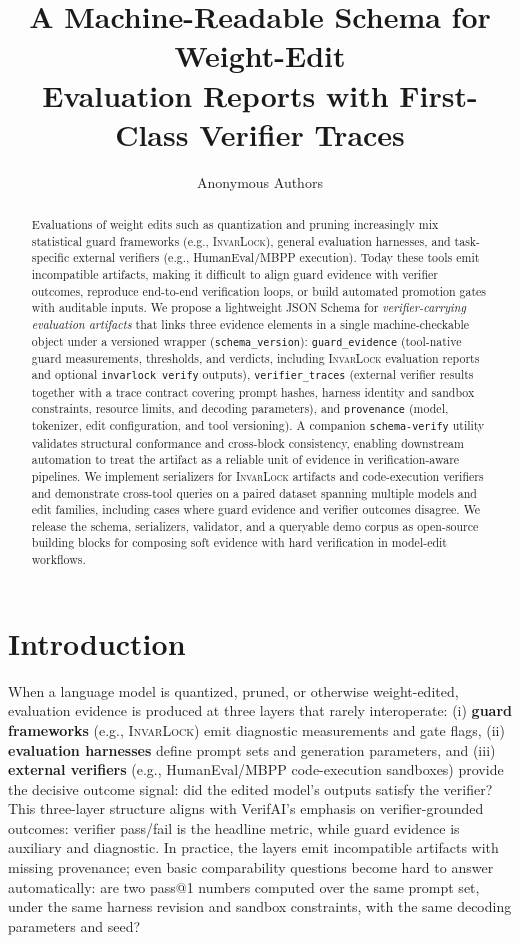 \documentclass{article} %
\title{A Machine-Readable Schema for Weight-Edit\\Evaluation Reports with First-Class Verifier Traces}
\author{Anonymous Authors}
\newcommand{\invarlock}{\textsc{InvarLock}\xspace}
\newcommand{\schemaverify}{\texttt{schema-verify}\xspace}
\begin{document}
\maketitle

\begin{abstract}
Evaluations of weight edits such as quantization and pruning increasingly mix
statistical guard frameworks (e.g., \invarlock), general evaluation harnesses,
and task-specific external verifiers (e.g., HumanEval/MBPP execution).
Today these tools emit incompatible artifacts, making it difficult to align guard
evidence with verifier outcomes, reproduce end-to-end verification loops, or
build automated promotion gates with auditable inputs.
We propose a lightweight JSON Schema for \emph{verifier-carrying evaluation artifacts}
that links three evidence elements in a single machine-checkable object under a
versioned wrapper (\texttt{schema\_version}):
\texttt{guard\_evidence} (tool-native guard measurements, thresholds, and verdicts, including
\invarlock evaluation reports and optional \texttt{invarlock verify} outputs),
\texttt{verifier\_traces} (external verifier results together with a trace contract covering prompt
hashes, harness identity and sandbox constraints, resource limits, and decoding parameters),
and \texttt{provenance} (model, tokenizer, edit configuration, and tool versioning).
A companion \schemaverify utility validates structural conformance and cross-block consistency,
enabling downstream automation to treat the artifact as a reliable unit of evidence in
verification-aware pipelines.
We implement serializers for \invarlock artifacts and code-execution verifiers and demonstrate
cross-tool queries on a paired dataset spanning multiple models and edit families, including cases
where guard evidence and verifier outcomes disagree.
We release the schema, serializers, validator, and a queryable demo corpus as open-source building
blocks for composing soft evidence with hard verification in model-edit workflows.
\end{abstract}

\section{Introduction}
When a language model is quantized, pruned, or otherwise weight-edited, evaluation evidence is
produced at three layers that rarely interoperate:
(i) \textbf{guard frameworks} (e.g., \invarlock) emit diagnostic measurements and gate flags,
(ii) \textbf{evaluation harnesses} define prompt sets and generation parameters, and
(iii) \textbf{external verifiers} (e.g., HumanEval/MBPP code-execution sandboxes) provide the
decisive outcome signal: did the edited model's outputs satisfy the verifier?
This three-layer structure aligns with VerifAI's emphasis on verifier-grounded outcomes:
verifier pass/fail is the headline metric, while guard evidence is auxiliary and diagnostic.
In practice, the layers emit incompatible artifacts with missing provenance; even basic
comparability questions become hard to answer automatically: are two pass@1 numbers computed over
the same prompt set, under the same harness revision and sandbox constraints, with the same
decoding parameters and seed?
\end{document}
